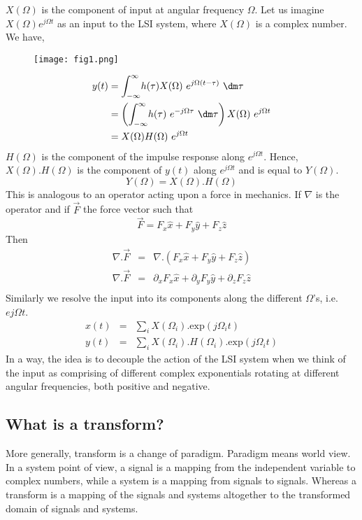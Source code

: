 	$X(\Omega)$ is the component of input at angular frequency $\Omega$. Let us imagine $X(\Omega)e^{j\Omega t}$ as an input to the LSI system, where $X(\Omega)$ is a complex number.\\
	We have,
	\begin{figure}[h!]
		\centering
		\texttt{[image: fig1.png]}
	\end{figure}
	\begin{align}
		y(t) &= \int_{-\infty}^{\infty} \! h(\tau) X(\Omega) \ e^{j\Omega (t-\tau)} \ \dm \tau\\
		&= \left( \int_{-\infty}^{\infty} \! h(\tau) \ e^{-j\Omega \tau} \ \dm \tau \right) X(\Omega) \ e^{j\Omega t}\\
		&= X(\Omega) H(\Omega) \ e^{j\Omega t}
	\end{align}
	$H(\Omega)$ is the component of the impulse response along $e^{j\Omega t}$. Hence, $X(\Omega).H(\Omega)$ is the component of $y(t)$ along $e^{j\Omega t}$ and is equal to $Y(\Omega)$.\\
	\begin{equation}
		Y(\Omega)=X(\Omega).H(\Omega)
	\end{equation}
	This is analogous to an operator acting upon a force in mechanics. If $\nabla$ is the operator and if $\vec{F}$ the force vector such that
	\begin{equation}
	\vec{F}=F_x \hat{x} + F_y \hat{y} + F_z \hat{z}
	\end{equation}
	Then
	\begin{eqnarray}
	\nabla . \vec{F} &=& \nabla . (F_x \hat{x} + F_y \hat{y} + F_z \hat{z})\\
	\nabla . \vec{F} &=& \partial_x F_x \hat{x} + \partial_y F_y \hat{y} + \partial_z F_z \hat{z}\\
	\end{eqnarray}
	Similarly we resolve the input into its components along the different $\Omega$'s, i.e. $ej\Omega  t$.
	\begin{eqnarray}
	x(t)&=&\sum_i X(\Omega_i).\textrm{exp}(j\Omega_i t)\\
	y(t)&=&\sum _i X(\Omega_i).H(\Omega_i).\textrm{exp}(j\Omega_i t)
	\end{eqnarray}
	In a way, the idea is to decouple the action of the LSI system when we think of the input as comprising of different complex exponentials rotating at different angular frequencies, both positive and negative.
\subsection{What is a transform?}
	More generally, transform is a change of paradigm. Paradigm means world view. In a system point of view, a signal is a mapping from the independent variable to complex numbers, while a system is a mapping from signals to signals. Whereas a transform is a mapping of the signals and systems altogether to the transformed domain of signals and systems.

